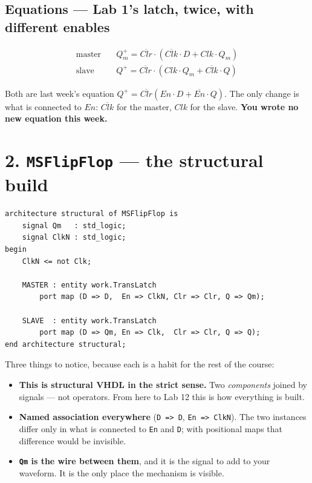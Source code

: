 \documentclass[11pt]{article}
\newcommand{\code}[1]{\texttt{#1}}
\begin{document}
\subsection*{Equations --- Lab 1's latch, twice, with different enables}

\begin{align*}
\text{master} \quad & Q_m^{+} = \overline{Clr}\cdot\left( \overline{Clk}\cdot D + Clk\cdot Q_m \right)\\
\text{slave}  \quad & Q^{+}   = \overline{Clr}\cdot\left( Clk\cdot Q_m + \overline{Clk}\cdot Q \right)
\end{align*}

Both are last week's equation $Q^{+} = \overline{Clr}(En\cdot D + \overline{En}\cdot Q)$.
The only change is what is connected to $En$: $\overline{Clk}$ for the master,
$Clk$ for the slave. \textbf{You wrote no new equation this week.}

\section*{2. \code{MSFlipFlop} --- the structural build}

\begin{lstlisting}
architecture structural of MSFlipFlop is
    signal Qm   : std_logic;
    signal ClkN : std_logic;
begin
    ClkN <= not Clk;

    MASTER : entity work.TransLatch
        port map (D => D,  En => ClkN, Clr => Clr, Q => Qm);

    SLAVE  : entity work.TransLatch
        port map (D => Qm, En => Clk,  Clr => Clr, Q => Q);
end architecture structural;
\end{lstlisting}

Three things to notice, because each is a habit for the rest of the course:

\begin{itemize}[leftmargin=1.6em,itemsep=2pt]
\item \textbf{This is structural VHDL in the strict sense.} Two \emph{components}
joined by signals --- not operators. From here to Lab 12 this is how everything is
built.
\item \textbf{Named association everywhere} (\code{D => D}, \code{En => ClkN}).
The two instances differ only in what is connected to \code{En} and \code{D}; with
positional maps that difference would be invisible.
\item \textbf{\code{Qm} is the wire between them}, and it is the signal to add to
your waveform. It is the only place the mechanism is visible.
\end{itemize}
\end{document}
